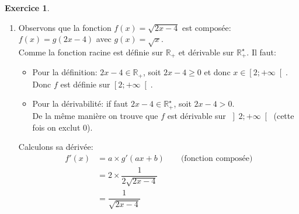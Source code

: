 \documentclass{exam}
\theoremstyle{definition}
\newtheorem{exercice}{Exercice}
\begin{document}
\begin{exercice}
\begin{enumerate}
\begin{itemize}
        \end{itemize}
        Donc $f$ est définie et dérivable sur $\mathbb{R}^\star$.\\
        Calculons sa dérivée:
        \begin{align*}
            f'(x) &= \left(\dfrac{x^4}{3} - \dfrac{2}{x}\right)'\\
            &= \left(\dfrac{x^4}{3}\right)' - \left(\dfrac{2}{x}\right)' \qquad \text{(somme de fonction $(u+v)' = u' + v'$)}\\
            &= \dfrac{1}{3}\left(x^4\right)' - 2\left(\dfrac{1}{x}\right)' \qquad \text{(produit par une constante $(\lambda u)' = \lambda u')$}\\
            &= \dfrac{1}{3}\times 4x^3 - 2 \left(-\dfrac{1}{x^2}\right)\\
            &= \dfrac{4x^3}{3} + \dfrac{2}{x^2}
        \end{align*}
        \item Observons que la fonction $f(x) = \sqrt{2x - 4}$ est composée: $f(x) = g(2x - 4)$ avec $g(x) = \sqrt{x}$.\\
        Comme la fonction racine est définie sur $\mathbb{R}_+$ et dérivable sur $\mathbb{R}_+^\star$. Il faut:
        \begin{itemize}
            \item Pour la définition: $2x - 4 \in \mathbb{R}_+$, soit $2x - 4 \geq 0$ et donc $x \in \left[2; +\infty\right[$.\\ Donc $f$ est définie sur $\left[2; +\infty\right[$.
            \item Pour la dérivabilité: if faut $2x - 4 \in \mathbb{R}_+^\star$, soit $2x - 4 > 0$.\\
            De la même manière on trouve que $f$ est dérivable sur $\left]2; +\infty\right[$ (cette fois on exclut $0$).
        \end{itemize}
        Calculons sa dérivée:
        \begin{align*}
            f'(x) &= a \times g'(ax + b) \qquad \text{(fonction composée)}\\
            &= 2 \times \dfrac{1}{2\sqrt{2x-4}}\\
            &= \dfrac{1}{\sqrt{2x - 4}}
        \end{align*}
    \end{enumerate}
\end{exercice}
\end{document}
